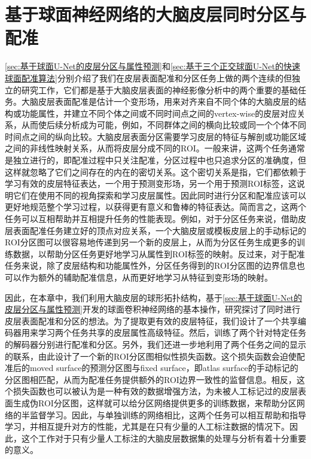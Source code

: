\chapter{基于球面神经网络的大脑皮层同时分区与配准}\label{sec:基于球面神经网络的大脑皮层同时分区与配准}

\ref{sec:基于球面U-Net的皮层分区与属性预测}和\ref{sec:基于三个正交球面U-Net的快速球面配准算法}分别介绍了我们在皮层表面配准和分区任务上做的两个连续的但独立的研究工作，它们都是基于大脑皮层表面的神经影像分析中的两个重要的基础任务。大脑皮层表面配准是估计一个变形场，用来对齐来自不同个体的大脑皮层的结构或功能属性，并建立不同个体之间或不同时间点之间的vertex-wise的皮层对应关系\cite{fischl1999high,yeo2009spherical,zhao2020unsupervised}，从而使后续分析成为可能，例如，不同群体之间的横向比较或同一个个体不同时间点之间的纵向比较。大脑皮层表面分区需要学习皮层的特征与解剖或功能区域之间的非线性映射关系，从而将皮层分成不同的ROI\cite{desikan2006automated,zhao2021sphericalDeformable,wu2018registration}。一般来讲，这两个任务通常是独立进行的\cite{li2019computational}，即配准过程中只关注配准，分区过程中也只追求分区的准确度，但这样就忽略了它们之间存在的内在的密切关系。这个密切关系是指，它们都依赖于学习有效的皮层特征表达，一个用于预测变形场，另一个用于预测ROI标签，这说明它们在使用不同的视角探索和学习皮层属性。因此同时进行分区和配准应该可以更好地规范整个学习过程，以获得更有意义和鲁棒的特征表达。简而言之，这两个任务可以互相帮助并互相提升任务的性能表现。例如，对于分区任务来说，借助皮层表面配准任务建立好的顶点对应关系，一个大脑皮层或模板皮层上的手动标记的ROI分区图可以很容易地传递到另一个新的皮层上，从而为分区任务生成更多的训练数据，以帮助分区任务更好地学习从属性到ROI标签的映射。反过来，对于配准任务来说，除了皮层结构和功能属性外，分区任务得到的ROI分区图的边界信息也可以作为额外的辅助配准信息，从而更好地学习从特征到变形场的映射。

因此，在本章中，我们利用大脑皮层的球形拓扑结构，基于\ref{sec:基于球面U-Net的皮层分区与属性预测}开发的球面卷积神经网络的基本操作，研究探讨了同时进行皮层表面配准和分区的想法。为了提取更有效的皮层特征，我们设计了一个共享编码器用来学习两个任务共享的皮层属性高级特征。然后，训练了两个针对特定任务的解码器分别进行配准和分区。另外，我们还进一步地利用了两个任务之间的显示的联系，由此设计了一个新的ROI分区图相似性损失函数。这个损失函数会迫使配准后的moved surface的预测分区图与fixed surface，即atlas surface的手动标记的分区图相匹配，从而为配准任务提供额外的ROI边界一致性的监督信息。相反，这个损失函数也可以被认为是一种有效的数据增强方法，为未被人工标记过的皮层表面生成伪ROI分区图，这样就可以给分区网络提供更多的训练数据，来帮助分区网络的半监督学习\cite{xu2019deepatlas}。因此，与单独训练的网络相比，这两个任务可以相互帮助和指导学习，并相互提升对方的性能，尤其是在只有少量的人工标注数据的情况下。因此，这个工作对于只有少量人工标注的大脑皮层数据集的处理与分析有着十分重要的意义。

